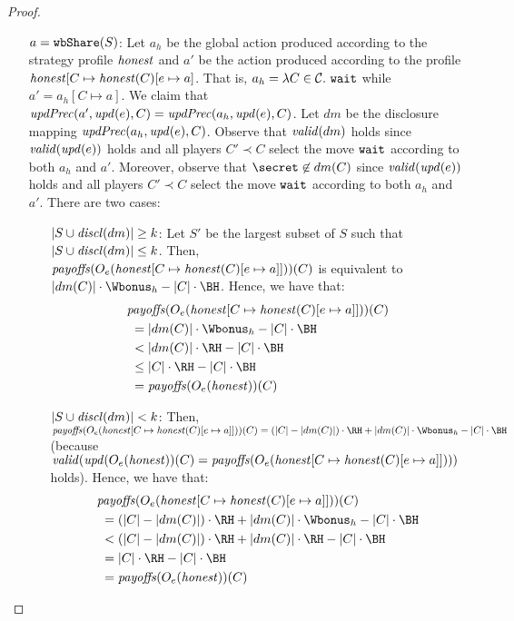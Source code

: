 \begin{proof}
\begin{itemize}
\begin{itemize}
\item[$a = \wShare{S}$:]
%
Let $a_h$ be the global action produced according to the strategy profile $\honest$ and $a'$ be the action produced according to the profile $\honest[C \mapsto \honest(C)[e \mapsto a]$.
%
That is, $a_h = \lambda C \in \coalitionSchema.\ \wait$ while $a'= a_h[C \mapsto a]$.
%
We claim that  $ \updPrec{a'}{\update{e}}{C} =  \updPrec{a_h}{\update{e}}{C}$.
%
Let $dm$ be the disclosure mapping $\updPrec{a_h}{\update{e}}{C}$.
%
Observe that $\valid{dm}$ holds since $\valid{\update{e}}$ holds and all players $C' \prec C$ select the move $\wait$ according to both $a_h$ and $a'$.
%
Moreover, observe that $\secret \not\in dm(C)$ since $\valid{\update{e}}$ holds and all players $C' \prec C$ select the move $\wait$ according to both $a_h$ and $a'$.
%
There are two cases:
\begin{itemize}
\item[$|S \cup \disclosed{dm}| \geq k$:]
%
Let $S'$ be the largest subset of $S$ such that $|S \cup \disclosed{dm}| \leq k$.
%
Then, $\payoffs(\subgameOutcome{\honest[C \mapsto \honest(C)[e \mapsto a]]}{e})(C)$ is equivalent to  $|dm(C)| \cdot \Wbonus_h - |C| \cdot \BH$.
%
Hence, we have that:
%
	\begin{align*}
			&\payoffs(\subgameOutcome{\honest[C \mapsto \honest(C)[e \mapsto a]]}{e})(C) \\
			&\ = |dm(C)| \cdot \Wbonus_h - |C| \cdot \BH \\  
			&\ < |dm(C)| \cdot \RH - |C| \cdot \BH \\	%
			&\ \leq |C| \cdot \RH - |C| \cdot \BH \\	%
			&\ = \payoffs(\subgameOutcome{\honest}{e})(C) %
	\end{align*}
%
\item[$|S \cup \disclosed{dm}| < k$:] 
%
Then, $\payoffs(\subgameOutcome{\honest[C \mapsto \honest(C)[e \mapsto a]]}{e})(C) = (|C| - |dm(C)|) \cdot \RH + |dm(C)| \cdot \Wbonus_h - |C| \cdot \BH$ (because $\valid{\update{\subgameOutcome{\honest}{e})(C) = \payoffs(\subgameOutcome{\honest[C \mapsto \honest(C)[e \mapsto a]]}{e}}}$ holds).
%
Hence, we have that:
	\begin{align*}
			&\payoffs(\subgameOutcome{\honest[C \mapsto \honest(C)[e \mapsto a]]}{e})(C) \\
			&\ = (|C| - |dm(C)|) \cdot \RH + |dm(C)| \cdot \Wbonus_h - |C| \cdot \BH \\  
			&\ < (|C| - |dm(C)|) \cdot \RH + |dm(C)| \cdot \RH - |C| \cdot \BH \\	%
			&\ = |C|  \cdot \RH - |C| \cdot \BH \\ 
			&\ = \payoffs(\subgameOutcome{\honest}{e})(C) %
	\end{align*}



\end{itemize}
\end{itemize}
\end{itemize}
\end{proof}
